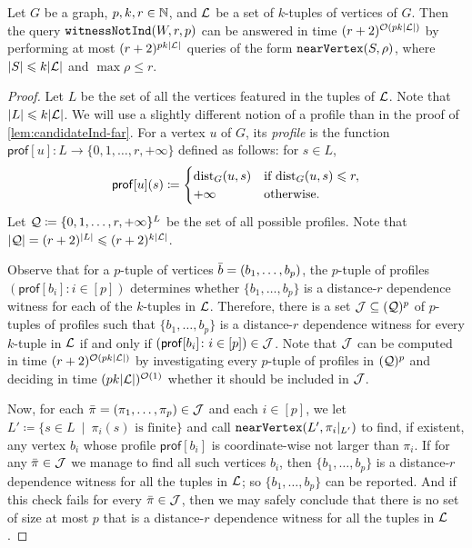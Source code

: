 \begin{lemma}\label{lem:witnessInd-near}
	Let $G$ be a graph, $p,k,r\in \N$, and $\cal L$ be a set of $k$-tuples of vertices of $G$. Then the query $\witnessInd{W,r,p}$ can be answered in time $(r+2)^{\Oh(pk|\cal L|)}$ by performing at most $(r+2)^{pk|\cal L|}$ queries of the form $\near{S,\rho}$, where $|S|\leq k|\cal L|$ and $\max \rho\leq r$.
\end{lemma}
\begin{proof}
	Let $L$ be the set of all the vertices featured in the tuples of $\cal L$. Note that $|L|\leq k|\cal L|$. We will use a slightly different notion of a profile than in the proof of \cref{lem:candidateInd-far}. For a vertex $u$ of $G$, its \emph{profile} is the function $\mathsf{prof}[u]\colon L\to \{0,1,\ldots,r,+\infty\}$ defined as follows: for $s\in L$,
	\[\mathsf{prof}[u](s)\coloneqq \begin{cases} \dist_G(u,s) &\textrm{if }\dist_G(u,s)\leq r,\\
		+\infty &\textrm{otherwise.}\end{cases}\]
	Let $\cal Q\coloneqq \{0,1,\ldots,r,+\infty\}^L$ be the set of all possible profiles. Note that $|\cal Q|=(r+2)^{|L|}\leq (r+2)^{k|\cal L|}$. 
	
	Observe that for a $p$-tuple of vertices $\tup b=(b_1,\ldots,b_p)$, the $p$-tuple of profiles $(\mathsf{prof}[b_i]\colon i\in [p])$ determines whether $\{b_1,\ldots,b_p\}$ is a distance-$r$ dependence witness for each of the $k$-tuples in $\cal L$. Therefore, there is a set $\cal J\subseteq (\cal Q)^p$ of $p$-tuples of profiles such that $\{b_1,\ldots,b_p\}$ is a distance-$r$ dependence witness for every $k$-tuple in $\cal L$ if and only if $(\mathsf{prof}[b_i]\colon i\in [p])\in \cal J$. Note that $\cal J$ can be computed in time $(r+2)^{\Oh(pk|\cal L|)}$ by investigating every $p$-tuple of profiles in $(\cal Q)^p$ and deciding in time $(pk|\cal L|)^{\Oh(1)}$ whether it should be included in $\cal J$.
	
	Now, for each $\tup \pi=(\pi_1,\ldots,\pi_p)\in \cal J$ and each $i\in [p]$, we let $L'\coloneqq \{s\in L~\mid~\pi_i(s)\textrm{ is finite}\}$ and call $\near{L',\pi_i|_{L'}}$ to find, if existent, any vertex $b_i$ whose profile $\mathsf{prof}[b_i]$ is coordinate-wise not larger than $\pi_i$. If for any $\tup \pi\in \cal J$ we manage to find all such vertices $b_i$, then $\{b_1,\ldots,b_p\}$ is a distance-$r$ dependence witness for all the tuples in $\cal L$; so $\{b_1,\ldots,b_p\}$ can be reported. And if this check fails for every $\tup \pi\in \cal J$, then we may safely conclude that there is no set of size at most $p$ that is a distance-$r$ dependence witness for all the tuples in $\cal L$.
\end{proof}

